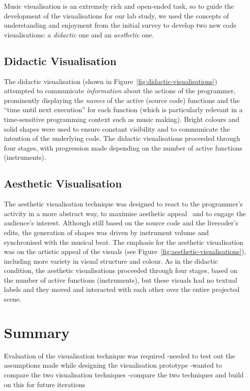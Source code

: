 Music visualisation is an extremely rich and open-ended task, so to guide the development of the visualisations for our lab study, we used the concepts of understanding and enjoyment from the initial survey to develop two new code visualisations: a \emph{didactic} one and an \emph{aesthetic} one. 

\subsection{Didactic Visualisation}
\label{sec:didactic-visualisation}

The didactic visualisation (shown in Figure~\ref{fig:didactic-visualisations}) attempted to communicate \emph{information} about the actions of the programmer, prominently displaying the \emph{names} of the active (source code) functions and the ``time until next execution'' for each function (which is particularly relevant in a time-sensitive programming context such as music making). Bright colours and solid shapes were used to ensure constant visibility and to communicate the intention of the underlying code. The didactic visualisations proceeded through four stages, with progression made depending on the number of active functions (instruments).

\subsection{Aesthetic Visualisation}
\label{sec:aesthetic-visualisation}

The aesthetic visualisation technique was designed to react to the programmer's activity in a more abstract way, to maximise aesthetic appeal~\cite{Cawthon2007} and to engage the audience's interest. Although still based on the source code and the livecoder's edits, the generation of shapes was driven by instrument volume and synchronised with the musical beat. The emphasis for the aesthetic visualisation was on the artistic appeal of the visuals (see Figure~\ref{fig:aesthetic-visualisations}), including more variety in visual structure and colour. As in the didactic condition, the aesthetic visualisations proceeded through four stages, based on the number of active functions (instruments), but these visuals had no textual labels and they moved and interacted with each other over the entire projected scene.

\section{Summary}

Evaluation of the visualisation technique was required 
-needed to test out the assumptions made while designing the visualisation prototype
-wanted to compare the two visualisation techniques
-compare the two techniques and build on this for future iterations



